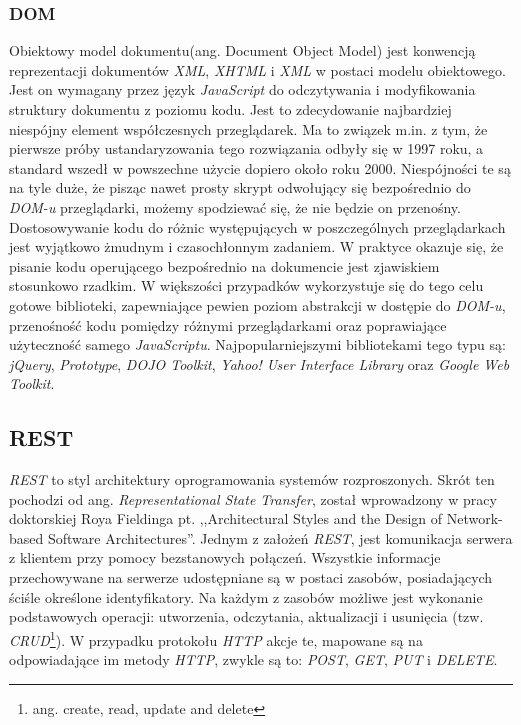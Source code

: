 \documentclass[a4paper,12pt]{article}
\begin{document}
\subsubsection{DOM}
Obiektowy model dokumentu(ang. Document Object Model) jest konwencją
reprezentacji dokumentów \emph{XML}, \emph{XHTML} i \emph{XML} w
postaci modelu obiektowego. Jest on wymagany przez język
\emph{JavaScript} do odczytywania i modyfikowania struktury dokumentu
z poziomu kodu. Jest to zdecydowanie najbardziej niespójny element
współczesnych przeglądarek. Ma to związek m.in. z tym, że pierwsze
próby ustandaryzowania tego rozwiązania odbyły się w 1997 roku, a
standard wszedł w powszechne użycie dopiero około roku
2000. Niespójności te są na tyle duże, że pisząc nawet prosty skrypt
odwołujący się bezpośrednio do \emph{DOM-u} przeglądarki, możemy
spodziewać się, że nie będzie on przenośny. Dostosowywanie kodu do
różnic występujących w poszczególnych przeglądarkach jest wyjątkowo
żmudnym i czasochłonnym zadaniem. W praktyce okazuje się, że pisanie
kodu operującego bezpośrednio na dokumencie jest zjawiskiem stosunkowo
rzadkim. W większości przypadków wykorzystuje się do tego celu gotowe
biblioteki, zapewniające pewien poziom abstrakcji w dostępie do
\emph{DOM-u}, przenośność kodu pomiędzy różnymi przeglądarkami oraz
poprawiające użyteczność samego
\emph{JavaScriptu}. Najpopularniejszymi bibliotekami tego typu są:
\emph{jQuery}, \emph{Prototype}, \emph{DOJO Toolkit}, \emph{Yahoo!
  User Interface Library} oraz \emph{Google Web Toolkit}.

\subsection{REST}
\emph{REST} to styl architektury oprogramowania systemów
rozproszonych. Skrót ten pochodzi od ang. \emph{Representational State
  Transfer}, został wprowadzony w pracy doktorskiej Roya Fieldinga
pt. ,,Architectural Styles and the Design of Network-based Software
Architectures''\cite{rest}. Jednym z założeń \emph{REST}, jest
komunikacja serwera z klientem przy pomocy bezstanowych
połączeń. Wszystkie informacje przechowywane na serwerze udostępniane
są w postaci zasobów, posiadających ściśle określone
identyfikatory. Na każdym z zasobów możliwe jest wykonanie
podstawowych operacji: utworzenia, odczytania, aktualizacji i
usunięcia (tzw. \emph{CRUD}\footnote{ang. create, read, update and
  delete}). W przypadku protokołu \emph{HTTP} akcje te, mapowane są na
odpowiadające im metody \emph{HTTP}, zwykle są to: \emph{POST},
\emph{GET}, \emph{PUT} i \emph{DELETE}\cite{agile}.
\end{document}
